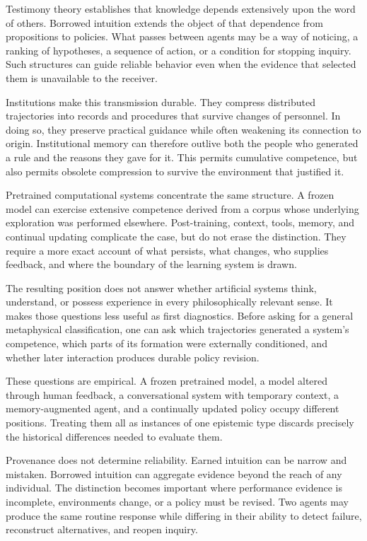 \documentclass[11pt]{article}
\begin{document}
Testimony theory establishes that knowledge depends extensively upon the word of others. Borrowed intuition extends the object of that dependence from propositions to policies. What passes between agents may be a way of noticing, a ranking of hypotheses, a sequence of action, or a condition for stopping inquiry. Such structures can guide reliable behavior even when the evidence that selected them is unavailable to the receiver.

Institutions make this transmission durable. They compress distributed trajectories into records and procedures that survive changes of personnel. In doing so, they preserve practical guidance while often weakening its connection to origin. Institutional memory can therefore outlive both the people who generated a rule and the reasons they gave for it. This permits cumulative competence, but also permits obsolete compression to survive the environment that justified it.

Pretrained computational systems concentrate the same structure. A frozen model can exercise extensive competence derived from a corpus whose underlying exploration was performed elsewhere. Post-training, context, tools, memory, and continual updating complicate the case, but do not erase the distinction. They require a more exact account of what persists, what changes, who supplies feedback, and where the boundary of the learning system is drawn.

The resulting position does not answer whether artificial systems think, understand, or possess experience in every philosophically relevant sense. It makes those questions less useful as first diagnostics. Before asking for a general metaphysical classification, one can ask which trajectories generated a system's competence, which parts of its formation were externally conditioned, and whether later interaction produces durable policy revision.

These questions are empirical. A frozen pretrained model, a model altered through human feedback, a conversational system with temporary context, a memory-augmented agent, and a continually updated policy occupy different positions. Treating them all as instances of one epistemic type discards precisely the historical differences needed to evaluate them.

Provenance does not determine reliability. Earned intuition can be narrow and mistaken. Borrowed intuition can aggregate evidence beyond the reach of any individual. The distinction becomes important where performance evidence is incomplete, environments change, or a policy must be revised. Two agents may produce the same routine response while differing in their ability to detect failure, reconstruct alternatives, and reopen inquiry.
\end{document}
